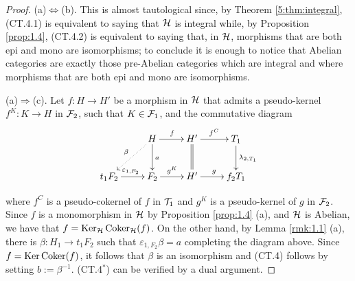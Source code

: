 \begin{proof}
  (a)$\Leftrightarrow$(b). This is almost tautological since, by Theorem \ref{5:thm:integral}, (CT.4.1) is equivalent to saying that $\mathcal{H}$ is integral while, by Proposition \ref{prop:1.4}, (CT.4.2) is equivalent to saying that, in $\mathcal{H}$, morphisms that are both epi and mono are isomorphisms; to conclude it is enough to notice that Abelian categories are exactly those pre-Abelian categories which are integral and where morphisms that are both epi and mono are isomorphisms.


\smallskip\noindent
(a)$\Rightarrow$(c).
Let $f\colon H\to H'$ be a morphism in $\mathcal{H}$ that admits a pseudo-kernel $f^K\colon K\to H$ in $\mathcal{F}_2$, such that $K\in \mathcal{F}_1$, and the commutative diagram
\begin{equation*}
\xymatrix{
 & H\ar@{.>}[dl]_{\beta}\ar[d]^{a}\ar[r]^{f} & H'\ar@{=}[d]\ar[r]^{f^C} & T_1\ar[d]^{\lambda_{2,T_1}}\\
t_1F_2\ar[r]^{\varepsilon_{1,F_2}} & F_2\ar[r]^{g^K} & H'\ar[r]^{g} & f_2T_1
}
\end{equation*}
\begin{sloppypar}
where $f^C$  is a pseudo-cokernel of $f$ in $\mathcal{T}_1$ and $g^K$ is a pseudo-kernel of $g$ in $\mathcal{F}_2$. Since $f$ is a monomorphism in $\mathcal{H}$ by Proposition \ref{prop:1.4} (a), and $\mathcal{H}$ is Abelian, we have that ${f=\operatorname{Ker}_{\mathcal{H}} \operatorname{Coker}_{\mathcal{H}} (f)}$. On the other hand, by Lemma \ref{rmk:1.1} (a), there is $\beta\colon H_1\to t_1F_2$ such that $\varepsilon_{1,F_2}\beta = a$ completing the diagram above. Since $f=\operatorname{Ker} \operatorname{Coker}(f)$, it follows that $\beta$ is an isomorphism and (CT.4) follows by setting $b:=\beta^{-1}$. (CT.4$^*$) can be verified by a dual argument.
\end{sloppypar}




\end{proof}
